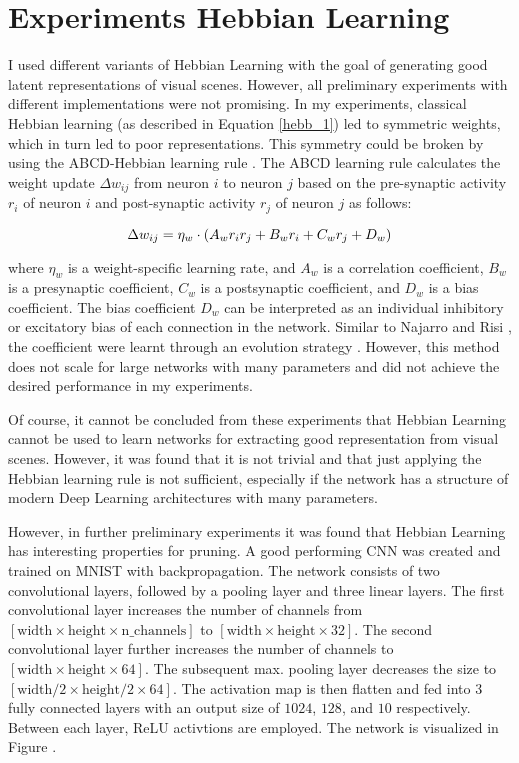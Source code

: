 \pagebreak
\chapter{Experiments Hebbian Learning}
I used different variants of Hebbian Learning with the goal of generating good latent representations of visual scenes.
However, all preliminary experiments with different implementations were not promising.
In my experiments, classical Hebbian learning (as described in Equation \eqref{hebb_1}) led to symmetric weights, which in turn led to poor representations.
This symmetry could be broken by using the ABCD-Hebbian learning rule .
The ABCD learning rule calculates the weight update \(\Delta w_{ij}\) from neuron \(i\) to neuron \(j\) based on the pre-synaptic activity \(r_i\) of neuron \(i\) and post-synaptic activity \(r_j\) of neuron \(j\) as follows:

\begin{equation}\eqlbl{hebb_abcd}
	\Delta w_{ij} = \eta_w \cdot (A_wr_ir_j+B_wr_i+C_wr_j+D_w)
\end{equation}

where \(\eta_w\) is a weight-specific learning rate, and \(A_w\) is a correlation coefficient, \(B_w\) is a presynaptic coefficient, \(C_w\) is a postsynaptic coefficient, and \(D_w\) is a bias coefficient.
The bias coefficient \(D_w\) can be interpreted as an individual inhibitory or excitatory bias of each connection in the network.
Similar to Najarro and Risi , the coefficient were learnt through an evolution strategy .
However, this method does not scale for large networks with many parameters and did not achieve the desired performance in my experiments.

Of course, it cannot be concluded from these experiments that Hebbian Learning cannot be used to learn networks for extracting good representation from visual scenes.
However, it was found that it is not trivial and that just applying the Hebbian learning rule is not sufficient, especially if the network has a structure of modern Deep Learning architectures with many parameters.

However, in further preliminary experiments it was found that Hebbian Learning has interesting properties for pruning.
A good performing CNN was created and trained on MNIST with backpropagation.
The network consists of two convolutional layers, followed by a pooling layer and three linear layers.
The first convolutional layer increases the number of channels from \([\text{width} \times \text{height} \times \text{n\_channels}]\) to \([\text{width} \times \text{height} \times 32]\).
The second convolutional layer further increases the number of channels to \([\text{width} \times \text{height} \times 64]\).
The subsequent max. pooling layer decreases the size to \([\text{width}/2 \times \text{height}/2 \times 64]\).
The activation map is then flatten and fed into 3 fully connected layers with an output size of \(1024\), \(128\), and \(10\) respectively.
Between each layer, ReLU activtions are employed.
The network is visualized in Figure .

